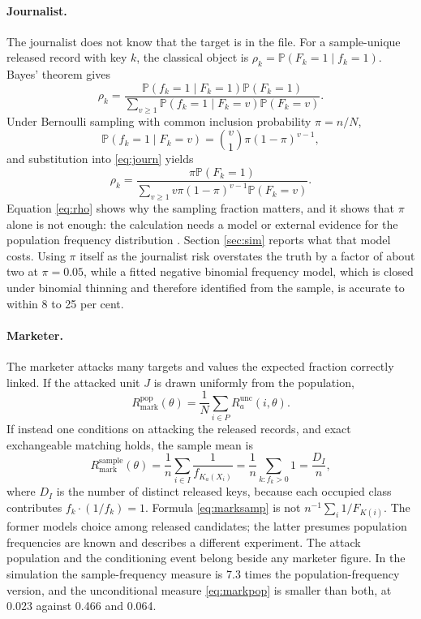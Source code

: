 \documentclass[11pt,a4paper]{article}
\theoremstyle{plain}
\theoremstyle{definition}
\newcommand{\Prob}{\mathbb{P}}
\begin{document}
\paragraph{Journalist.}
The journalist does not know that the target is in the file. For a
sample-unique released record with key $k$, the classical object is
$\rho_k = \Prob(F_k = 1 \mid f_k = 1)$. Bayes' theorem gives
\begin{equation}
\rho_k = \frac{\Prob(f_k = 1 \mid F_k = 1)\Prob(F_k = 1)}
{\sum_{v \geq 1}\Prob(f_k = 1 \mid F_k = v)\Prob(F_k = v)} .
\label{eq:journ}
\end{equation}
Under Bernoulli sampling with common inclusion probability $\pi = n/N$,
\begin{equation}
\Prob(f_k = 1 \mid F_k = v) = \binom{v}{1}\pi(1-\pi)^{v-1} ,
\label{eq:binom}
\end{equation}
and substitution into \eqref{eq:journ} yields
\begin{equation}
\rho_k = \frac{\pi \Prob(F_k = 1)}
{\sum_{v \geq 1} v\pi(1-\pi)^{v-1}\Prob(F_k = v)} .
\label{eq:rho}
\end{equation}
Equation \eqref{eq:rho} shows why the sampling fraction matters, and it shows
that $\pi$ alone is not enough: the calculation needs a model or external
evidence for the population frequency distribution
\citep{skinner2002,reiter2005,rinott2006}. Section \ref{sec:sim} reports what
that model costs. Using $\pi$ itself as the journalist risk overstates the truth
by a factor of about two at $\pi = 0.05$, while a fitted negative binomial frequency model, which is closed under
binomial thinning and therefore identified from the sample, is accurate to within 8 to
25 per cent.

\paragraph{Marketer.}
The marketer attacks many targets and values the expected fraction correctly
linked. If the attacked unit $J$ is drawn uniformly from the population,
\begin{equation}
R_{\mathrm{mark}}^{\mathrm{pop}}(\theta) = \frac{1}{N}\sum_{i \in P}
R_a^{\mathrm{unc}}(i, \theta) .
\label{eq:markpop}
\end{equation}
If instead one conditions on attacking the released records, and exact
exchangeable matching holds, the sample mean is
\begin{equation}
R_{\mathrm{mark}}^{\mathrm{sample}}(\theta)
= \frac{1}{n}\sum_{i \in I}\frac{1}{f_{K_a(X_i)}}
= \frac{1}{n}\sum_{k : f_k > 0} 1
= \frac{D_I}{n} ,
\label{eq:marksamp}
\end{equation}
where $D_I$ is the number of distinct released keys, because each occupied
class contributes $f_k \cdot (1/f_k) = 1$. Formula \eqref{eq:marksamp} is not
$n^{-1}\sum_i 1/F_{K(i)}$. The former models choice among released candidates;
the latter presumes population frequencies are known and describes a different
experiment. The attack population and the conditioning event belong beside any
marketer figure. In the simulation the sample-frequency
measure is 7.3 times the population-frequency version, and the unconditional
measure \eqref{eq:markpop} is smaller than both, at 0.023 against 0.466 and
0.064.
\end{document}
